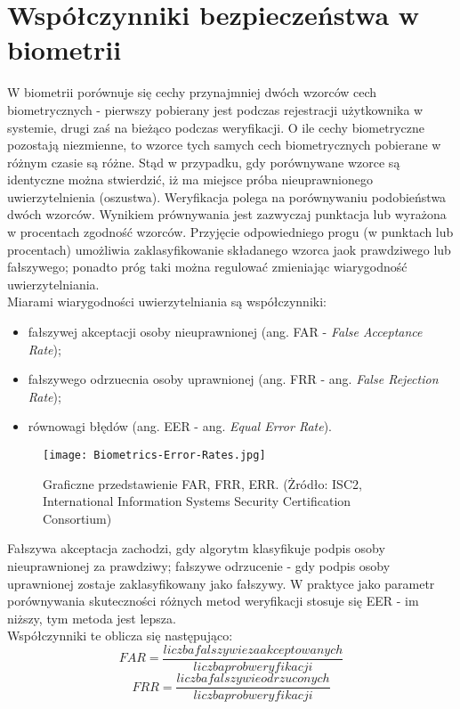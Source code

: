 \documentclass[notitlepage, oneside]{report}
\begin{document}
 \section*{Współczynniki bezpieczeństwa w biometrii}
 W biometrii porównuje się cechy przynajmniej dwóch wzorców cech biometrycznych - pierwszy pobierany jest podczas rejestracji użytkownika w systemie, drugi zaś na bieżąco podczas weryfikacji. O ile cechy biometryczne pozostają niezmienne, to wzorce tych samych cech biometrycznych pobierane w różnym czasie są różne. Stąd w przypadku, gdy porównywane wzorce są identyczne można stwierdzić, iż ma miejsce próba nieuprawnionego uwierzytelnienia (oszustwa). Weryfikacja polega na porównywaniu podobieństwa dwóch wzorców. Wynikiem prównywania jest zazwyczaj punktacja lub wyrażona w procentach zgodność wzorców. Przyjęcie odpowiedniego progu (w punktach lub procentach) umożliwia zaklasyfikowanie składanego wzorca jaok prawdziwego lub fałszywego; ponadto próg taki można regulować zmieniając wiarygodność uwierzytelniania. \\
 
Miarami wiarygodności uwierzytelniania są współczynniki:
  \begin{itemize}
      \item fałszywej akceptacji osoby nieuprawnionej (ang. FAR - \textit{False Acceptance Rate});
      \item fałszywego odrzuecnia osoby uprawnionej (ang. FRR - ang. \textit{False Rejection Rate});
      \item równowagi błędów (ang. EER - ang. \textit{Equal Error Rate}).
  \end{itemize}
  
\begin{figure}
\centering
\texttt{[image: Biometrics-Error-Rates.jpg]}
\caption{Graficzne przedstawienie FAR, FRR, ERR. (Żródło: ISC2, International Information Systems Security Certification Consortium)}
\end{figure}



  
  Fałszywa akceptacja zachodzi, gdy algorytm klasyfikuje podpis osoby nieuprawnionej za prawdziwy; fałszywe odrzucenie - gdy podpis osoby uprawnionej zostaje zaklasyfikowany jako fałszywy. W praktyce jako parametr porównywania skuteczności różnych metod weryfikacji stosuje się EER - im niższy, tym metoda jest lepsza. \\
  
  Współczynniki te oblicza się następująco:
  \begin{equation*}
      FAR = \frac{liczba falszywie zaakceptowanych}{liczba prob weryfikacji}
  \end{equation*}
  \begin{equation*}
      FRR = \frac{liczba falszywie odrzuconych}{liczba prob weryfikacji}
  \end{equation*}
  
\end{document}
